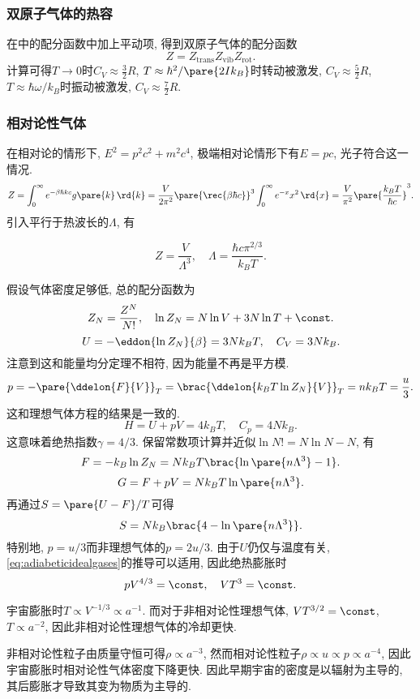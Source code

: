 \documentclass[../Thermal.tex]{subfiles}
\begin{document}
\subsubsection{双原子气体的热容}
在中的配分函数中加上平动项, 得到双原子气体的配分函数
\[ Z = Z_{\mathrm{trans}}Z_{\mathrm{vib}}Z_{\mathrm{rot}}. \]
计算可得$T\rightarrow 0$时$C_V\approx \frac{3}{2}R$, $T\approx \hbar^2/\pare{2Ik_B}$时转动被激发, $C_V\approx\frac{5}{2}R$, $T\approx \hbar\omega/k_B$时振动被激发, $C_V\approx \frac{7}{2}R$.
\subsubsection{相对论性气体}
在相对论的情形下, $E^2 = p^2c^2 + m^2 c^4$, 极端相对论情形下有$E=pc$, 光子符合这一情况.
\[ Z = \int_0^\infty e^{-\beta \hbar kc}g\pare{k}\,\rd{k} = \frac{V}{2\pi^2}\pare{\rec{\beta\hbar c}}^3\int_0^\infty e^{-x}x^2\,\rd{x} = \frac{V}{\pi^2}\pare{\frac{k_B T}{\hbar c}}^3. \]
引入平行于热波长的$\Lambda$, 有
\begin{finale}
\[ Z = \frac{V}{\Lambda^3},\quad \Lambda = \frac{\hbar c\pi^{2/3}}{k_BT}. \]
\end{finale}
假设气体密度足够低, 总的配分函数为
\[ Z_N = \frac{Z^N}{N!},\quad \ln Z_N = N \ln V + 3N \ln T + \const. \]
\[ U = -\eddon{\ln Z_N}{\beta} = 3Nk_BT,\quad C_V = 3Nk_B. \]
注意到这和能量均分定理不相符, 因为能量不再是平方模.
\begin{equation}
\label{eq:pisu3}
p = -\pare{\ddelon{F}{V}}_T = \brac{\ddelon{k_BT\ln Z_N}{V}}_T = nk_BT = \frac{u}{3}.
\end{equation}
这和理想气体方程的结果是一致的.
\[ H = U + pV = 4k_BT,\quad C_p = 4Nk_B. \]
这意味着绝热指数$\gamma=4/3$. 保留常数项计算并近似$\ln N! = N\ln N - N$, 有
\[ F = -k_B\ln Z_N = Nk_BT\brac{\ln \pare{n\Lambda^3} - 1}. \]
\[ G = F + pV = Nk_BT\ln\pare{n\Lambda^3}. \]
再通过$S=\pare{U-F}/T$可得
\[ S = Nk_B\brac{4 - \ln\pare{n\Lambda^3}}. \]
特别地, $p=u/3$而非理想气体的$p=2u/3$. 由于$U$仍仅与温度有关, \eqref{eq:adiabeticidealgases}的推导可以适用, 因此绝热膨胀时
\[ pV^{4/3} = \const,\quad VT^3 = \const. \]
\begin{ex}
宇宙膨胀时$T\propto V^{-1/3} \propto a^{-1}$. 而对于非相对论性理想气体, $VT^{3/2}=\const$, $T\propto a^{-2}$, 因此非相对论性理想气体的冷却更快.
\end{ex}
\begin{ex}
非相对论性粒子由质量守恒可得$\rho \propto a^{-3}$, 然而相对论性粒子$\rho \propto u \propto p \propto a^{-4}$, 因此宇宙膨胀时相对论性气体密度下降更快. 因此早期宇宙的密度是以辐射为主导的, 其后膨胀才导致其变为物质为主导的.
\end{ex}
\end{document}
